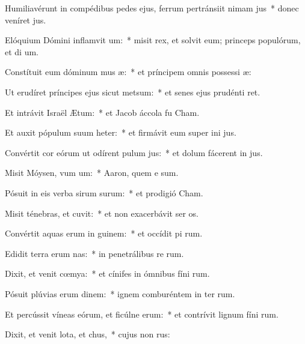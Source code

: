 \item Humiliavérunt in compédibus pedes ejus, ferrum pertránsiit nimam jus~* donec veníret  jus.
\item Elóquium Dómini inflamvit um:~* misit rex, et solvit eum; princeps populórum, et di um.
\item Constítuit eum dóminum mus æ:~* et príncipem omnis possessi æ:
\item Ut erudíret príncipes ejus sicut metsum:~* et senes ejus prudénti ret.
\item Et intrávit Israël  Ætum:~* et Jacob áccola fu   Cham.
\item Et auxit pópulum suum heter:~* et firmávit eum super ini jus.
\item Convértit cor eórum ut odírent pulum jus:~* et dolum fácerent in  jus.
\item Misit Móysen, vum um:~* Aaron, quem e sum.
\item Pósuit in eis verba sirum surum:~* et prodigió   Cham.
\item Misit ténebras, et cuvit:~* et non exacerbávit ser os.
\item Convértit aquas erum in guinem:~* et occídit pi rum.
\item Edidit terra erum nas:~* in penetrálibus re rum.
\item Dixit, et venit cœmya:~* et cínifes in ómnibus fíni rum.
\item Pósuit plúvias erum dinem:~* ignem comburéntem in ter rum.
\item Et percússit víneas eórum, et ficúlne erum:~* et contrívit lignum fíni rum.
\item Dixit, et venit lota, et chus,~* cujus non  rus:

